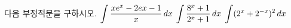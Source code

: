 다음 부정적분을 구하시오.
 $\displaystyle\int \dfrac{xe^x-2ex-1}{x}\mkern3mu dx$
 $\displaystyle\int \dfrac{8^x+1}{2^x+1}\mkern3mu dx$
 $\displaystyle\int (2^x+2^{-x})^2\mkern3mu dx$
